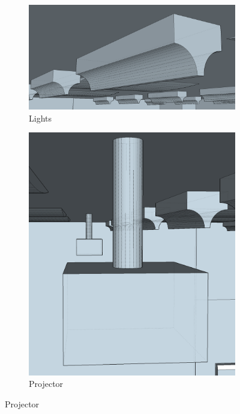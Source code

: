 \documentclass[../../main.tex]{subfiles}
\begin{document}
			\begin{figure}[ht]
				\begin{subfigure}[t]{4in}
					\centering
					\includegraphics[scale = 0.25]{Sections/Implementation/Modelling/images/lights2.png}
					\caption{Lights}
				\end{subfigure}
				\begin{subfigure}[t]{3in}
					\centering
					\includegraphics[scale = 0.25]{Sections/Implementation/Modelling/images/projector1.png}
					\caption{Projector}
				\end{subfigure}

\end{figure}
\end{document}
